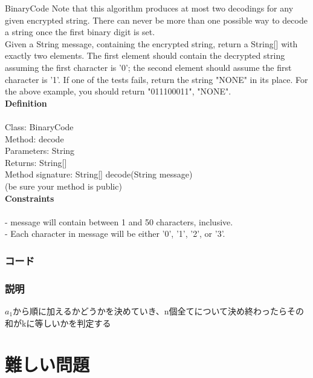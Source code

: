 \documentclass[a4j,10pt,oneside,openany]{jsbook}
\begin{document}
\begin{breakitembox}[l]{BinaryCode}
Note that this algorithm produces at most two decodings for any given encrypted string. There can never be more than one possible way to decode a string once the first binary digit is set.\\
Given a String message, containing the encrypted string, return a String[] with exactly two elements. The first element should contain the decrypted string assuming the first character is '0'; the second element should assume the first character is '1'. If one of the tests fails, return the string "NONE" in its place. For the above example, you should return {"011100011", "NONE"}.\\

{\bf Definition}\\\\
Class:	BinaryCode\\
Method:	decode\\
Parameters:	String\\
Returns:	String[]\\
Method signature:	String[] decode(String message)\\
(be sure your method is public)\\

{\bf Constraints}\\\\
-	message will contain between 1 and 50 characters, inclusive.\\
-	Each character in message will be either '0', '1', '2', or '3'.\\

\end{breakitembox}
\subsection*{コード}
\begin{framed}

\end{framed}

\subsection*{説明}
$a_1$から順に加えるかどうかを決めていき、n個全てについて決め終わったらその和がkに等しいかを判定する

\hrulefill


\chapter{難しい問題}
\end{document}
